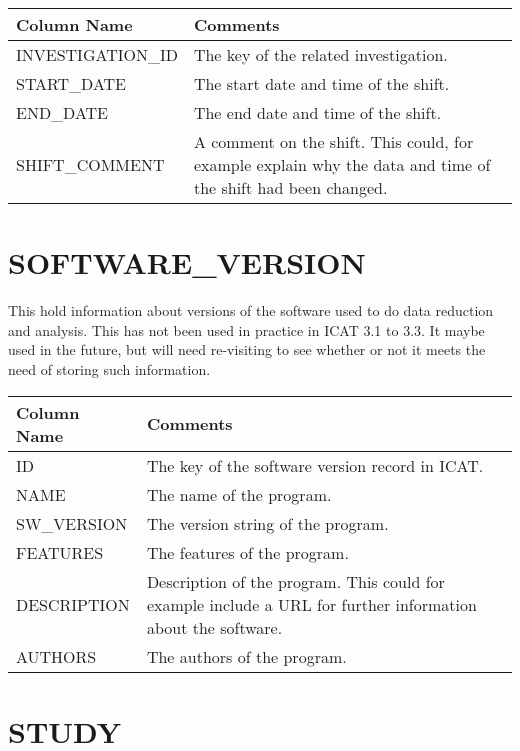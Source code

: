 \documentclass{report}
\begin{document}
\begin{tabular}{|l|l|}
\hline
Column Name & Comments \\ \hline
INVESTIGATION\_ID & \multicolumn{1}{p{100mm}|}{
The key of the related investigation.} \\ \hline
START\_DATE & \multicolumn{1}{p{100mm}|}{
The start date and time of the shift.} \\ \hline
END\_DATE & \multicolumn{1}{p{100mm}|}{
The end date and time of the shift.} \\ \hline
SHIFT\_COMMENT & \multicolumn{1}{p{100mm}|}{
A comment on the shift. This could, for example explain why the data and time of the shift had been changed.} \\ \hline
\end{tabular}
\section{SOFTWARE\_VERSION}

This hold information about versions of the software used to do data reduction and analysis. This has not been used in practice in ICAT 3.1 to 3.3. It maybe used in the future, but will need re-visiting to see whether or not it meets the need of storing such information.\\

\begin{tabular}{|l|l|}
\hline
Column Name & Comments \\ \hline
ID & \multicolumn{1}{p{100mm}|}{
The key of the software version record	in ICAT.} \\ \hline
NAME & \multicolumn{1}{p{100mm}|}{
The name of the program.} \\ \hline
SW\_VERSION & \multicolumn{1}{p{100mm}|}{
The version string of the program.} \\ \hline
FEATURES & \multicolumn{1}{p{100mm}|}{
The features of the program.} \\ \hline
DESCRIPTION & \multicolumn{1}{p{100mm}|}{
Description of the program. This could for example include a URL for further information about the software.} \\ \hline
AUTHORS & \multicolumn{1}{p{100mm}|}{
The authors of the program.} \\ \hline
\end{tabular}
\section{STUDY}
\end{document}
